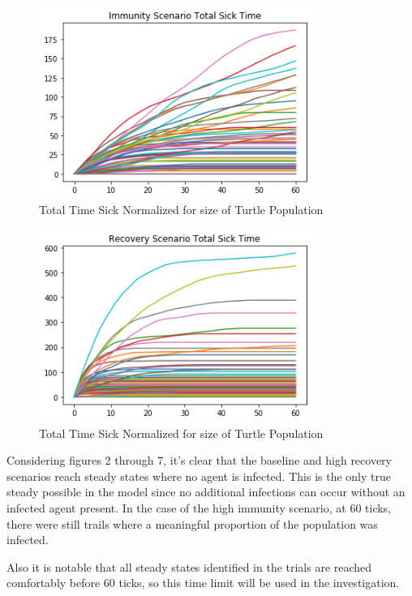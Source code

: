 \documentclass[11pt]{article} %
\begin{document}

\begin{figure}
\centering
\includegraphics[width=0.8\textwidth]{immunity_total_sicktime}
\caption{Total Time Sick Normalized for size of Turtle Population}
\end{figure}


\begin{figure}
\centering
\includegraphics[width=0.8\textwidth]{recovery_total_sicktime}
\caption{Total Time Sick Normalized for size of Turtle Population}
\end{figure}

Considering figures 2 through 7, it's clear that the baseline and high recovery scenarios reach steady states where no agent is infected. This is the only true steady possible in the model since no additional infections can occur without an infected agent present. In the case of the high immunity scenario, at 60 ticks, there were still  trails where a meaningful proportion of the population was infected.

Also it is notable that all steady states identified in the trials are reached comfortably before 60 ticks, so this time limit will be used in the investigation.  
\end{document}
